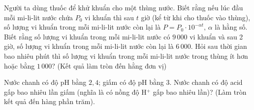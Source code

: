 \begin{bt}%
	Người ta dùng thuốc để khử khuẩn cho một thùng nước. Biết rằng nếu lúc đầu mỗi mi-li-lit nước chứa $P_{0}$ vi khuẩn thì sau $t$ giờ (kể từ khi cho thuốc vào thùng), số lượng vi khuẩn trong mỗi mi-li-lit nước còn lại là $P=P_{0} \cdot 10^{-\alpha t}, \,\alpha$ là hằng số. Biết rằng số lượng vi khuẩn trong mỗi mi-li-lit nước có $9\,000$ vi khuẩn và sau 2 giờ, số lượng vi khuẩn trong mỗi mi-li-lit nước còn lại là $6\,000$. Hỏi sau thời gian bao nhiêu phút thì số lượng vi khuẩn trong mỗi mi-li-lit nước trong thùng ít hơn hoặc bằng $1\,000$? (Kết quả làm tròn đến hằng đơn vị)
	
\end{bt}

\begin{bt}%
	Nước chanh có độ pH bằng $2{,}4$; giấm có độ pH bằng $3$. Nước chanh có độ acid gấp bao nhiêu lần giấm (nghĩa là có nồng độ H$^{+}$ gấp bao nhiêu lần)? (Làm tròn kết quả đến hàng phần trăm).
\end{bt}

